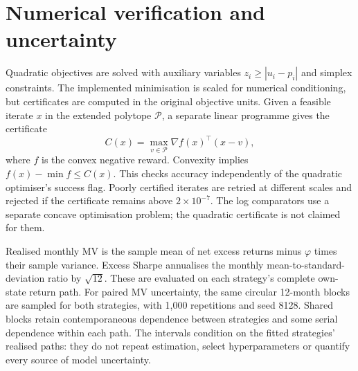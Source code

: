 \documentclass[sigconf,anonymous,review]{acmart}
\begin{document}
\section{Numerical verification and uncertainty}\label{app:verification}
Quadratic objectives are solved with auxiliary variables $z_i\ge |u_i-p_i|$ and simplex constraints. The implemented minimisation is scaled for numerical conditioning, but certificates are computed in the original objective units. Given a feasible iterate $x$ in the extended polytope $\mathcal P$, a separate linear programme gives the certificate
\begin{equation}
 C(x)=\max_{v\in\mathcal P}\nabla f(x)^\top(x-v),
\end{equation}
where $f$ is the convex negative reward. Convexity implies $f(x)-\min f\le C(x)$. This checks accuracy independently of the quadratic optimiser's success flag. Poorly certified iterates are retried at different scales and rejected if the certificate remains above $2\times10^{-7}$. The log comparators use a separate concave optimisation problem; the quadratic certificate is not claimed for them.

Realised monthly MV is the sample mean of net excess returns minus $\varphi$ times their sample variance. Excess Sharpe annualises the monthly mean-to-standard-deviation ratio by $\sqrt{12}$. These are evaluated on each strategy's complete own-state return path. For paired MV uncertainty, the same circular 12-month blocks are sampled for both strategies, with 1,000 repetitions and seed 8128. Shared blocks retain contemporaneous dependence between strategies and some serial dependence within each path. The intervals condition on the fitted strategies' realised paths: they do not repeat estimation, select hyperparameters or quantify every source of model uncertainty.
\end{document}
